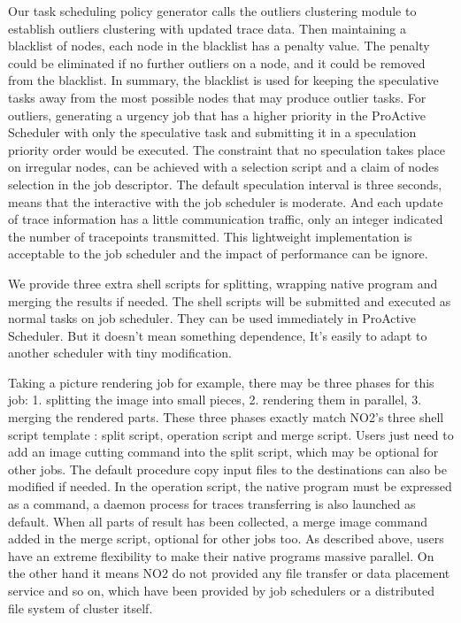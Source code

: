 Our task scheduling policy generator calls the outliers clustering module to establish outliers clustering with updated trace data. Then maintaining a blacklist of nodes, each node in the blacklist has a penalty value. The penalty could be eliminated if no further outliers on a node, and it could be removed from the blacklist. In summary, the blacklist is used for keeping the speculative tasks away from the most possible nodes that may produce outlier tasks. For outliers, generating a urgency job that has a higher priority in the ProActive Scheduler with only the speculative task and submitting it in a speculation priority order would be executed. The constraint that no speculation takes place on irregular nodes, can be achieved with a selection script and a claim of nodes selection in the job descriptor. The default speculation interval is three seconds, means that the interactive with the job scheduler is moderate. And each update of trace information has a little communication traffic, only an integer indicated the number of  tracepoints transmitted. This lightweight implementation is acceptable to the job scheduler and the impact of performance can be ignore.

We provide three extra shell scripts for splitting, wrapping native program and merging the results if needed. The shell scripts will be submitted and executed as normal tasks on job scheduler. They can be used immediately in ProActive Scheduler. But it doesn't mean something dependence, It’s easily to adapt to another scheduler with tiny modification.

Taking a picture rendering job for example, there may be three phases for this job: 1. splitting the image into small pieces, 2. rendering them in parallel, 3. merging the rendered parts. These three phases exactly match NO2's three shell script template : split script, operation script and merge script. Users just need to add an image cutting command into the split script, which may be optional for other jobs. The default procedure copy input files to the destinations can also be modified if needed. In the operation script, the native program must be expressed as a command, a daemon process for traces transferring is also launched as default. When all parts of result has been collected, a merge image command added in the merge script, optional for other jobs too. As described above,  users have an extreme flexibility to make their native programs massive parallel. On the other hand it means NO2 do not provided any file transfer or data placement service and so on, which have been provided by job schedulers or a distributed file system of cluster itself.
